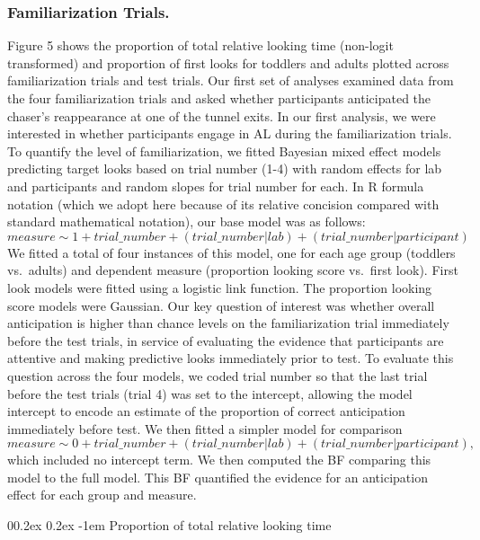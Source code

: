 \documentclass[
  english,
  man,floatsintext]{apa6}
\makeatletter
\let\oldparagraph\paragraph
\renewcommand{\paragraph}[1]{\oldparagraph{#1}\mbox{}}
\renewcommand{\paragraph}{\@startsection{paragraph}{4}{\parindent}%
  {0\baselineskip \@plus 0.2ex \@minus 0.2ex}%
  {-1em}%
  {\normalfont\normalsize\bfseries\itshape\typesectitle}}
\makeatother
\begin{document}
\hypertarget{familiarization-trials.}{%
\subsubsection{Familiarization Trials.}\label{familiarization-trials.}}

Figure 5 shows the proportion of total relative looking time (non-logit transformed) and proportion of first looks for toddlers and adults plotted across familiarization trials and test trials. Our first set of analyses examined data from the four familiarization trials and asked whether participants anticipated the chaser's reappearance at one of the tunnel exits. In our first analysis, we were interested in whether participants engage in AL during the familiarization trials. To quantify the level of familiarization, we fitted Bayesian mixed effect models predicting target looks based on trial number (1-4) with random effects for lab and participants and random slopes for trial number for each.
In R formula notation (which we adopt here because of its relative concision compared with standard mathematical notation), our base model was as follows:
\(measure \sim 1 + trial\_number + (trial\_number | lab) + (trial\_number | participant)\)
We fitted a total of four instances of this model, one for each age group (toddlers vs.~adults) and dependent measure (proportion looking score vs.~first look). First look models were fitted using a logistic link function. The proportion looking score models were Gaussian.
Our key question of interest was whether overall anticipation is higher than chance levels on the familiarization trial immediately before the test trials, in service of evaluating the evidence that participants are attentive and making predictive looks immediately prior to test. To evaluate this question across the four models, we coded trial number so that the last trial before the test trials (trial 4) was set to the intercept, allowing the model intercept to encode an estimate of the proportion of correct anticipation immediately before test. We then fitted a simpler model for comparison
\(measure \sim 0 + trial\_number + (trial\_number | lab) + (trial\_number | participant),\)
which included no intercept term. We then computed the BF comparing this model to the full model. This BF quantified the evidence for an anticipation effect for each group and measure.

\hypertarget{proportion-of-total-relative-looking-time}{%
\paragraph{Proportion of total relative looking time}\label{proportion-of-total-relative-looking-time}}
\end{document}
